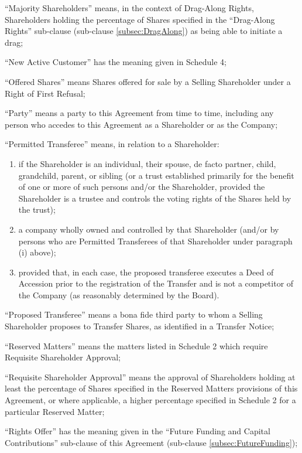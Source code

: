 ``Majority Shareholders'' means, in the context of Drag-Along Rights, Shareholders holding the percentage of Shares specified in the ``Drag-Along Rights'' sub-clause (sub-clause \ref{subsec:DragAlong}) as being able to initiate a drag;

``New Active Customer'' has the meaning given in Schedule 4;

``Offered Shares'' means Shares offered for sale by a Selling Shareholder under a Right of First Refusal;

``Party'' means a party to this Agreement from time to time, including any person who accedes to this Agreement as a Shareholder or as the Company;

``Permitted Transferee'' means, in relation to a Shareholder:
\begin{enumerate}[label=(\roman*)]
\item if the Shareholder is an individual, their spouse, de facto partner, child, grandchild, parent, or sibling (or a trust established primarily for the benefit of one or more of such persons and/or the Shareholder, provided the Shareholder is a trustee and controls the voting rights of the Shares held by the trust);
\item a company wholly owned and controlled by that Shareholder (and/or by persons who are Permitted Transferees of that Shareholder under paragraph (i) above);
\item provided that, in each case, the proposed transferee executes a Deed of Accession prior to the registration of the Transfer and is not a competitor of the Company (as reasonably determined by the Board).
\end{enumerate}

``Proposed Transferee'' means a bona fide third party to whom a Selling Shareholder proposes to Transfer Shares, as identified in a Transfer Notice;

``Reserved Matters'' means the matters listed in Schedule 2 which require Requisite Shareholder Approval;

``Requisite Shareholder Approval'' means the approval of Shareholders holding at least the percentage of Shares specified in the Reserved Matters provisions of this Agreement, or where applicable, a higher percentage specified in Schedule 2 for a particular Reserved Matter;

``Rights Offer'' has the meaning given in the ``Future Funding and Capital Contributions'' sub-clause of this Agreement (sub-clause \ref{subsec:FutureFunding});

